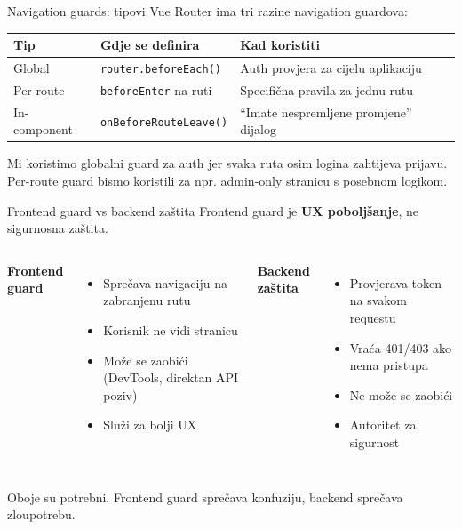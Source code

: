 \begin{frame}{Navigation guards: tipovi}
Vue Router ima tri razine navigation guardova:

\vspace{0.4em}
\begin{tabular}{@{}lp{4cm}p{5cm}@{}}
  \toprule
  \textbf{Tip} & \textbf{Gdje se definira} & \textbf{Kad koristiti} \\
  \midrule
  Global & \texttt{router.beforeEach()} & Auth provjera za cijelu aplikaciju \\
  Per-route & \texttt{beforeEnter} na ruti & Specifična pravila za jednu rutu \\
  In-component & \texttt{onBeforeRouteLeave()} & \enquote{Imate nespremljene promjene} dijalog \\
  \bottomrule
\end{tabular}

\vspace{0.6em}
Mi koristimo globalni guard za auth jer svaka ruta osim logina zahtijeva prijavu. Per-route guard bismo koristili za npr. admin-only stranicu s posebnom logikom.
\end{frame}

\begin{frame}{Frontend guard vs backend zaštita}
Frontend guard je \textbf{UX poboljšanje}, ne sigurnosna zaštita.

\vspace{0.6em}
\begin{columns}[T]
\textbf{Frontend guard}
\begin{itemize}
  \item Sprečava navigaciju na zabranjenu rutu
  \item Korisnik ne vidi stranicu
  \item Može se zaobići (DevTools, direktan API poziv)
  \item Služi za bolji UX
\end{itemize}

\textbf{Backend zaštita}
\begin{itemize}
  \item Provjerava token na svakom requestu
  \item Vraća 401/403 ako nema pristupa
  \item Ne može se zaobići
  \item Autoritet za sigurnost
\end{itemize}
\end{columns}

\vspace{0.6em}
Oboje su potrebni. Frontend guard sprečava konfuziju, backend sprečava zloupotrebu.
\end{frame}

